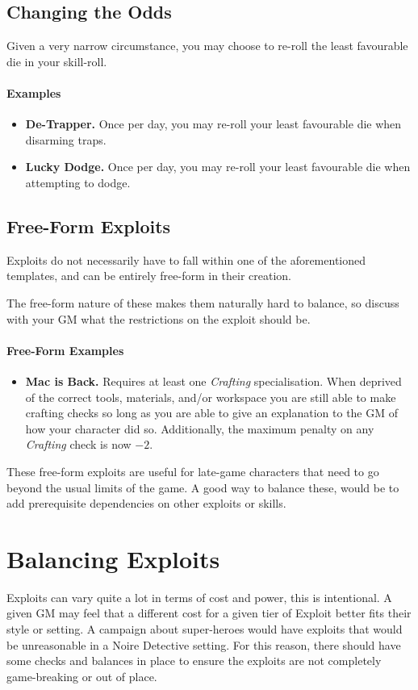 \subsection{Changing the Odds}
Given a very narrow circumstance, you may choose to re-roll the least favourable die in your skill-roll.
\paragraph{Examples}
\begin{itemize}
    \item \textbf{De-Trapper.} Once per day, you may re-roll your least favourable die when disarming traps.
    \item \textbf{Lucky Dodge.} Once per day, you may re-roll your least favourable die when attempting to dodge.
\end{itemize}

\subsection{Free-Form Exploits}
Exploits do not necessarily have to fall within one of the aforementioned templates, and can be entirely free-form in their creation.

The free-form nature of these makes them naturally hard to balance, so discuss with your GM what the restrictions on the exploit should be.

\paragraph{Free-Form Examples}
\begin{itemize}
    \item \textbf{Mac is Back.} Requires at least one \textit{Crafting} specialisation.
    When deprived of the correct tools, materials, and/or workspace you are still able to make crafting checks so long as you are able to give an explanation to the GM of how your character did so.
Additionally, the maximum penalty on any \textit{Crafting} check is now $-2$.
\end{itemize}

These free-form exploits are useful for late-game characters that need to go beyond the usual limits of the game. A good way to balance these, would be to add prerequisite dependencies on other exploits or skills.

\section{Balancing Exploits}\label{sec:exploit-balance}
Exploits can vary quite a lot in terms of cost and power, this is intentional. 
A given GM may feel that a different cost for a given tier of Exploit better fits their style or setting.
A campaign about super-heroes would have exploits that would be unreasonable in a Noire Detective setting.
For this reason, there should have some checks and balances in place to ensure the exploits are not completely game-breaking or out of place.

